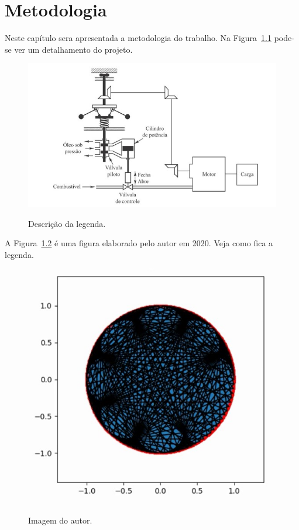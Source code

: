 \chapter{Metodologia} \label{metodologia}

Neste capítulo sera apresentada a metodologia do trabalho. Na Figura~\ref{fig:quadro} pode-se ver um detalhamento do projeto.

\begin{figure}[ht] %
    \begin{center}
    \caption{Descrição da legenda.} %
    \label{fig:quadro}
    \includegraphics[width=0.9\linewidth]{Figuras/imagem1.JPG} \\
    \end{center}
\end{figure}

A Figura~\ref{fig:icone} é uma figura elaborado pelo autor em 2020. Veja como fica a legenda.

\begin{figure}[H] %
    \begin{center}
    \caption{Imagem do autor.} %
    \label{fig:icone}
    \includegraphics[width=0.5\linewidth]{Figuras/imagem2.jpg} \\
    \end{center}
    \fonteautor
    
\end{figure}


